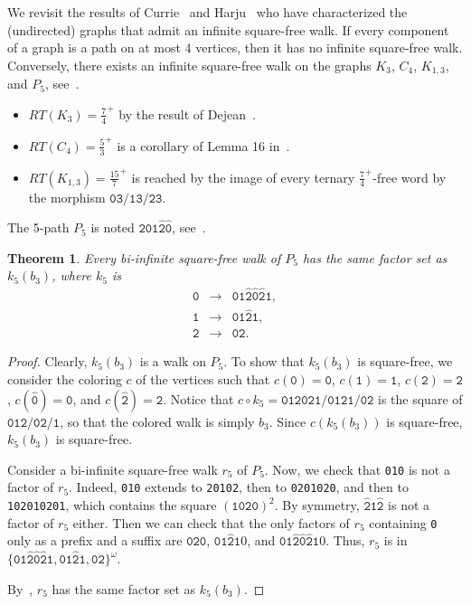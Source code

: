 \documentclass{article}
\theoremstyle{plain}
\newtheorem{theorem}{Theorem}
\theoremstyle{definition}
\theoremstyle{remark}
\begin{document}
We revisit the results of Currie~\cite{Currie91} and Harju~\cite{harju2011} who have characterized
the (undirected) graphs that admit an infinite square-free walk.
If every component of a graph is a path on at most 4 vertices, then it has no infinite square-free walk.
Conversely, there exists an infinite square-free walk on the graphs $K_3$, $C_4$, $K_{1,3}$, and $P_5$, see~.
\begin{itemize}
 \item $RT(K_3)=\tfrac74^+$ by the result of Dejean~\cite{Dejean:1972}.
 \item $RT(C_4)=\tfrac53^+$ is a corollary of Lemma 16 in~\cite{badkobeh2022avoiding}.
 \item $RT(K_{1,3})=\tfrac{15}7^+$ is reached by the image of every ternary $\tfrac74^+$-free word by the morphism $\texttt{03}/\texttt{13}/\texttt{23}$.
\end{itemize}

The 5-path $P_5$ is noted $\texttt{201}\hat{\texttt{2}}\hat{\texttt{0}}$, see~. 
\begin{theorem}
Every bi-infinite square-free walk of $P_5$ has the same factor set as $k_5(b_3)$, where $k_5$ is\\
$$\begin{array}{rcl}
\texttt{0}&\to&{\texttt{01}}\hat{\texttt{2}}\hat{\texttt{0}}\hat{\texttt{2}}\texttt{1},\\
\texttt{1}&\to&{\texttt{01}}\hat{\texttt{2}}\texttt{1},\\
\texttt{2}&\to&\texttt{02}.
\end{array}$$
\end{theorem}

\begin{proof}
Clearly, $k_5(b_3)$ is a walk on $P_5$. To show that $k_5(b_3)$ is square-free,
we consider the coloring $c$ of the vertices such that $c(\texttt{0})=\texttt{0}$, $c(\texttt{1})=\texttt{1}$,
$c(\texttt{2})=\texttt{2}$, $c(\hat{\texttt 0})=\texttt{0}$, and $c({\hat{\texttt 2}})=\texttt{2}$.
Notice that $c\circ k_5=\texttt{012021}/\texttt{0121}/\texttt{02}$ is the square of $\texttt{012}/\texttt{02}/\texttt{1}$,
so that the colored walk is simply $b_3$. Since $c(k_5(b_3))$ is square-free, $k_5(b_3)$ is square-free.

Consider a bi-infinite square-free walk $r_5$ of $P_5$. Now, we check that \texttt{010} is not a factor of $r_5$.
Indeed, \texttt{010} extends to \texttt{20102}, then to \texttt{0201020}, and then to \texttt{102010201},
which contains the square $(\texttt{1020})^2$.
By symmetry, $\hat{\texttt{2}}{\texttt{1}}\hat{\texttt{2}}$ is not a factor of $r_5$ either.
Then we can check that the only factors of $r_5$ containing \texttt{0} only as a prefix and a suffix are
$\texttt{020}$, $\texttt{01}\hat{\texttt{2}}{\texttt 10}$,
and $\texttt{01}\hat{\texttt{2}}\hat{\texttt{0}}\hat{\texttt{2}}{\texttt 10}$.
Thus, $r_5$ is in $\{\texttt{01}\hat{\texttt 2}\hat{\texttt 0}{\hat{\texttt 2}}{\texttt 1},\texttt{01}{\hat{\texttt 2}}{\texttt 1},{\texttt{02}}\}^\omega$.

By~, $r_5$ has the same factor set as $k_5(b_3)$.
\end{proof}
\end{document}
